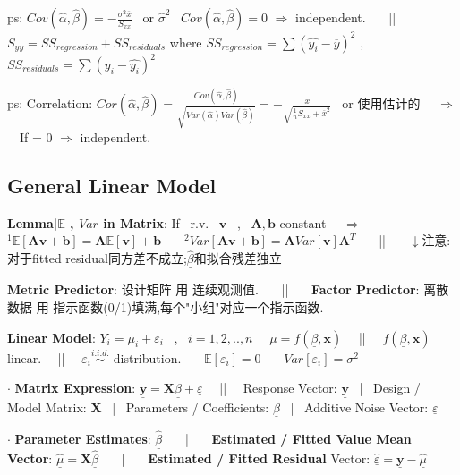 \documentclass[9pt]{article}
\begin{document}
{\footnotesize ps: $Cov(\widehat{\alpha},\widehat{\beta})=-\frac{\sigma^2\overline{x}}{S_{xx}}$ \ {\tiny or $\widehat{\sigma}^2$} \ $Cov(\widehat{\alpha},\widehat{\beta})=0$ $\Rightarrow$ independent. \ \ \ || \ \ $S_{yy}=SS_{regression}+SS_{residuals}$ where $SS_{regression}=\sum(\widehat{y_i}-\overline{y})^2$ , $SS_{residuals}=\sum(y_i-\widehat{y_i})^2$}

{\footnotesize ps: Correlation: $Cor(\widehat{\alpha},\widehat{\beta})=\frac{Cov(\widehat{\alpha},\widehat{\beta})}{\sqrt{Var(\widehat{\alpha})Var(\widehat{\beta})}}=-\frac{\overline{x}}{\sqrt{\frac{1}{n}S_{xx}+\overline{x}^2}}$ \ {\tiny or 使用估计的} \ \ $\Rightarrow$ \ \ If = 0 $\Rightarrow$ independent.}


\subsection{General Linear Model}

\textbf{Lemma|$\mathbb{E}$ , $Var$ in Matrix}: {\footnotesize If \ r.v. \ $\mathbf{v}$ \ , \ $\mathbf{A},\mathbf{b}$ constant \ \ $\Rightarrow$ \ \ $^1\mathbb{E}[\mathbf{A}\mathbf{v}+\mathbf{b}]=\mathbf{A}\mathbb{E}[\mathbf{v}] + \mathbf{b}$ \ \ \ $^2Var[\mathbf{Av+b}]=\mathbf{A}Var[\mathbf{v}]\mathbf{A}^T$} \ \ \ || \ \ \ {\tiny $\downarrow$注意:对于fitted residual同方差不成立;$\underline{\hat{\beta}}$和拟合残差独立}

\textbf{Metric Predictor}: {\scriptsize 设计矩阵 用 连续观测值.} \ \ \ || \ \ \ \textbf{Factor Predictor}: {\scriptsize 离散数据 用 指示函数(0/1)填满,每个"小组"对应一个指示函数.}

\textbf{Linear Model}: $Y_i=\mu_i+\varepsilon_i$ \ , \ $i=1,2,..,n$ \ \ $\mu=f(\underline{\beta},\mathbf{x})$ \ \ || \ \ {\footnotesize $f(\underline{\beta},\mathbf{x})$ linear.} \ \ || \ \ {\footnotesize $\varepsilon_i\stackrel{i.i.d.}{\sim}$ distribution. \ \ \ $\mathbb{E}[\varepsilon_i]=0$ \ \ \ $Var[\varepsilon_i]=\sigma^2$}

$\cdot$ \textbf{Matrix Expression}: $\underline{\mathbf{y}}=\mathbf{X}\underline{\beta}+\underline{\varepsilon}$ \ \ || \ \ {\scriptsize Response Vector: $\underline{\mathbf{y}}$ \ | \ Design / Model Matrix: $\mathbf{X}$ \ | \ Parameters / Coefficients: $\underline{\beta}$ \ | \ Additive Noise Vector: $\underline{\varepsilon}$}

$\cdot$ {\footnotesize \textbf{Parameter Estimates}: $\underline{\widehat{\beta}}$ \ \ \ | \ \ \ \textbf{Estimated / Fitted Value Mean Vector}: $\underline{\widehat{\mu}}=\mathbf{X}\underline{\widehat{\beta}}$ \ \ \ | \ \ \ \textbf{Estimated / Fitted Residual} Vector: $\underline{\widehat{\varepsilon}}=\mathbf{\underline{y}}-\underline{\widehat{\mu}}$}
\end{document}
